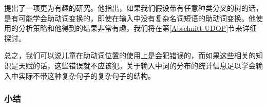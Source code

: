 
 \citet{Bod2009a}提出了一项更为有趣的研究。他指出，如果我们假设带有任意种类分叉的树的话，是有可能学会助动词变换的，即使在输入中没有复杂名词短语的助动词变换。他使用的分析策略和他得到的结果非常有趣，我们将在第\ref{Abschnitt-UDOP}节来详细探讨。

总之，我们可以说儿童在助动词位置的使用上是会犯错误的，而如果这些相关的知识是天赋的话，这些错误就不应该犯。关于输入中词的分布的统计信息足以学会输入中实际不带这种复杂句子的复杂句子的结构。

\subsubsection{小结}


